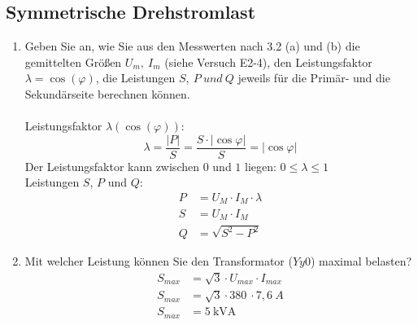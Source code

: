 \subsection{Symmetrische Drehstromlast }
\begin{enumerate}[label=\alph*)]
	\item Geben Sie an, wie Sie aus den Messwerten nach 3.2 (a) und (b) die gemittelten
	      Größen $U_m,\ I_m$ (siehe Versuch E2-4), den Leistungsfaktor
	      $\lambda=\cos(\varphi)$, die Leistungen $S,\ P\ und\ Q$ jeweils für die Primär-
	      und die Sekundärseite berechnen können.\\ \ \\ Leistungsfaktor $\lambda(\cos
			      (\varphi))$:
	      \[ \lambda = \frac{|P|}{S}=\frac{S\cdot |\cos \varphi|}{S} = |\cos \varphi| \]
	      Der Leistungsfaktor kann zwischen $0$ und $1$ liegen: $0 \leq \lambda \leq 1
	      $\\ Leistungen $S$, $P$ und $Q$:\\
	      \begin{align*}
		      P & = U_M\cdot I_M\cdot \lambda \\
		      S & = U_M\cdot I_M              \\
		      Q & = \sqrt{S^2-P^2}
	      \end{align*}

	\item Mit welcher Leistung können Sie den Transformator ($Yy0$) maximal belasten?
	      \begin{align*}
		      S_{max} & = \sqrt 3 \cdot U_{max}\cdot I_{max} \\
		      S_{max} & = \sqrt 3 \cdot 380\ \cdot 7,6\ A\\
          S_{max} & = 5\ \text{kVA}
	      \end{align*}
\end{enumerate}
